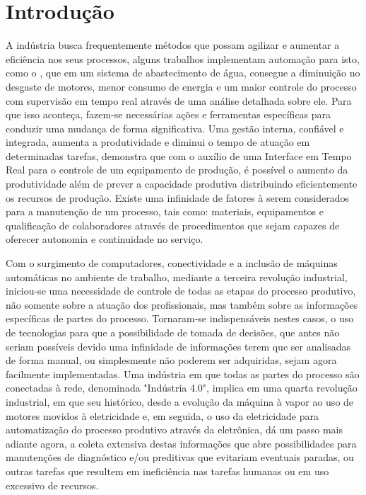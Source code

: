 \chapter{Introdução}
\label{cap:introducao}

A indústria busca frequentemente métodos que possam agilizar e aumentar a eficiência nos seus processos, alguns trabalhos implementam automação para isto, como o \cite{IndustriaEficiencia}, que em um sistema de abastecimento de água, consegue a diminuição no desgaste de motores, menor consumo de energia e um maior controle do processo com supervisão em tempo real através de uma análise detalhada sobre ele. Para que isso aconteça, fazem-se necessárias ações e ferramentas específicas para conduzir uma mudança de forma significativa.
Uma gestão interna, confiável e integrada, aumenta a produtividade e diminui o tempo de atuação em  determinadas tarefas, \cite{InterfaceTempoReal} demonstra que com o auxílio de uma Interface em Tempo Real para o controle de um equipamento de produção, é possível o aumento da produtividade além de prever a capacidade produtiva distribuindo eficientemente os recursos de produção. Existe uma infinidade de fatores à serem considerados para a manutenção de um processo, tais como: materiais, equipamentos e qualificação de colaboradores através de procedimentos que sejam capazes de oferecer autonomia e continuidade no serviço. 

Com o surgimento de computadores, conectividade e a inclusão de máquinas automáticas no ambiente de trabalho, mediante a terceira revolução industrial, iniciou-se uma necessidade de controle de todas as etapas do processo produtivo, não somente sobre a atuação dos profissionais, mas também sobre as informações específicas de partes do processo. Tornaram-se indispensáveis nestes casos, o uso de tecnologias para que a possibilidade de tomada de decisões, que antes não seriam possíveis devido uma infinidade de informações terem que ser analisadas de forma manual, ou simplesmente não poderem ser adquiridas, sejam agora facilmente implementadas. Uma indústria em que todas as partes do processo são conectadas à rede, denominada "Indústria 4.0", implica em uma quarta revolução industrial, em que seu histórico, desde a evolução da máquina à vapor ao uso de motores movidos à eletricidade e, em seguida, o uso da eletricidade para automatização do processo produtivo através da eletrônica, dá um passo mais adiante agora, a coleta extensiva destas informações que abre possibilidades para manutenções de diagnóstico e/ou preditivas que evitariam eventuais paradas, ou outras tarefas que resultem em ineficiência nas tarefas humanas ou em uso excessivo de recursos.

